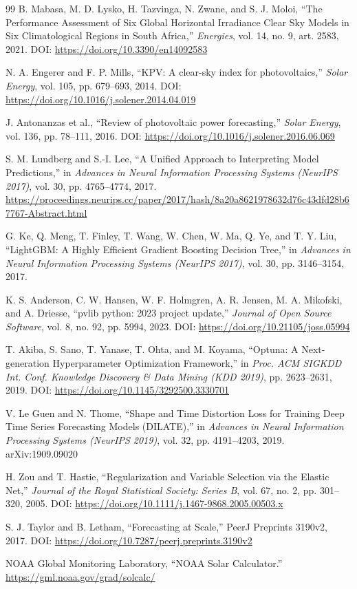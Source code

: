 \documentclass[12pt,a4paper]{article}
\begin{document}
\begin{thebibliography}{99}
B. Mabasa, M. D. Lysko, H. Tazvinga, N. Zwane, and S. J. Moloi,
``The Performance Assessment of Six Global Horizontal Irradiance Clear Sky Models in Six Climatological Regions in South Africa,''
\textit{Energies}, vol. 14, no. 9, art. 2583, 2021.
DOI: \url{https://doi.org/10.3390/en14092583}

N. A. Engerer and F. P. Mills,
``KPV: A clear-sky index for photovoltaics,''
\textit{Solar Energy}, vol. 105, pp. 679--693, 2014.
DOI: \url{https://doi.org/10.1016/j.solener.2014.04.019}

J. Antonanzas et al.,
``Review of photovoltaic power forecasting,''
\textit{Solar Energy}, vol. 136, pp. 78--111, 2016.
DOI: \url{https://doi.org/10.1016/j.solener.2016.06.069}

S. M. Lundberg and S.-I. Lee, 
``A Unified Approach to Interpreting Model Predictions,'' 
in \textit{Advances in Neural Information Processing Systems (NeurIPS 2017)}, vol. 30, pp. 4765--4774, 2017.
\url{https://proceedings.neurips.cc/paper/2017/hash/8a20a8621978632d76c43dfd28b67767-Abstract.html}

G. Ke, Q. Meng, T. Finley, T. Wang, W. Chen, W. Ma, Q. Ye, and T. Y. Liu, 
``LightGBM: A Highly Efficient Gradient Boosting Decision Tree,'' 
in \textit{Advances in Neural Information Processing Systems (NeurIPS 2017)}, vol. 30, pp. 3146--3154, 2017.

K. S. Anderson, C. W. Hansen, W. F. Holmgren, A. R. Jensen, M. A. Mikofski, and A. Driesse,
``pvlib python: 2023 project update,''
\textit{Journal of Open Source Software}, vol. 8, no. 92, pp. 5994, 2023.
DOI: \url{https://doi.org/10.21105/joss.05994}

T. Akiba, S. Sano, T. Yanase, T. Ohta, and M. Koyama, 
``Optuna: A Next-generation Hyperparameter Optimization Framework,'' 
in \textit{Proc. ACM SIGKDD Int. Conf. Knowledge Discovery \& Data Mining (KDD 2019)}, pp. 2623--2631, 2019.
DOI: \url{https://doi.org/10.1145/3292500.3330701}

V. Le Guen and N. Thome,
``Shape and Time Distortion Loss for Training Deep Time Series Forecasting Models (DILATE),''
in \textit{Advances in Neural Information Processing Systems (NeurIPS 2019)}, vol. 32, pp. 4191--4203, 2019. arXiv:1909.09020

H. Zou and T. Hastie,
``Regularization and Variable Selection via the Elastic Net,''
\textit{Journal of the Royal Statistical Society: Series B}, vol. 67, no. 2, pp. 301--320, 2005.
DOI: \url{https://doi.org/10.1111/j.1467-9868.2005.00503.x}

S. J. Taylor and B. Letham,
``Forecasting at Scale,'' PeerJ Preprints 3190v2, 2017.
DOI: \url{https://doi.org/10.7287/peerj.preprints.3190v2}

NOAA Global Monitoring Laboratory,
``NOAA Solar Calculator.''
\url{https://gml.noaa.gov/grad/solcalc/}
\end{thebibliography}
\end{document}
